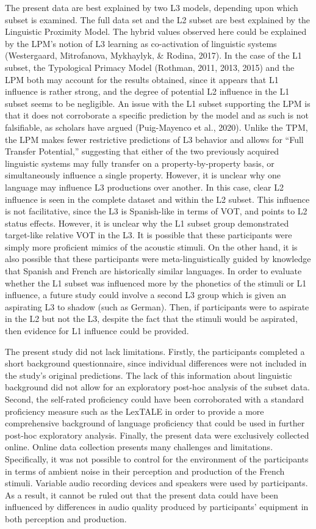 \documentclass[
  english,
  man]{apa6}
\begin{document}
The present data are best explained by two L3 models, depending upon which subset is examined. The full data set and the L2 subset are best explained by the Linguistic Proximity Model.
The hybrid values observed here could be explained by the LPM's notion of L3 learning as co-activation of linguistic systems (Westergaard, Mitrofanova, Mykhaylyk, \& Rodina, 2017).
In the case of the L1 subset, the Typological Primacy Model (Rothman, 2011, 2013, 2015) and the LPM both may account for the results obtained, since it appears that L1 influence is rather strong, and the degree of potential L2 influence in the L1 subset seems to be negligible.
An issue with the L1 subset supporting the LPM is that it does not corroborate a specific prediction by the model and as such is not falsifiable, as scholars have argued (Puig-Mayenco et al., 2020).
Unlike the TPM, the LPM makes fewer restrictive predictions of L3 behavior and allows for ``Full Transfer Potential,'' suggesting that either of the two previously acquired linguistic systems may fully transfer on a property-by-property basis, or simultaneously influence a single property.
However, it is unclear why one language may influence L3 productions over another. In this case, clear L2 influence is seen in the complete dataset and within the L2 subset.
This influence is not facilitative, since the L3 is Spanish-like in terms of VOT, and points to L2 status effects.
However, it is unclear why the L1 subset group demonstrated target-like relative VOT in the L3. It is possible that these participants were simply more proficient mimics of the acoustic stimuli.
On the other hand, it is also possible that these participants were meta-linguistically guided by knowledge that Spanish and French are historically similar languages.
In order to evaluate whether the L1 subset was influenced more by the phonetics of the stimuli or L1 influence, a future study could involve a second L3 group which is given an aspirating L3 to shadow (such as German).
Then, if participants were to aspirate in the L2 but not the L3, despite the fact that the stimuli would be aspirated, then evidence for L1 influence could be provided.

The present study did not lack limitations.
Firstly, the participants completed a short background questionnaire, since individual differences were not included in the study's original predictions.
The lack of this information about linguistic background did not allow for an exploratory post-hoc analysis of the subset data.
Second, the self-rated proficiency could have been corroborated with a standard proficiency measure such as the LexTALE in order to provide a more comprehensive background of language proficiency that could be used in further post-hoc exploratory analysis.
Finally, the present data were exclusively collected online. Online data collection presents many challenges and limitations.
Specifically, it was not possible to control for the environment of the participants in terms of ambient noise in their perception and production of the French stimuli.
Variable audio recording devices and speakers were used by participants.
As a result, it cannot be ruled out that the present data could have been influenced by differences in audio quality produced by participants' equipment in both perception and production.
\end{document}
